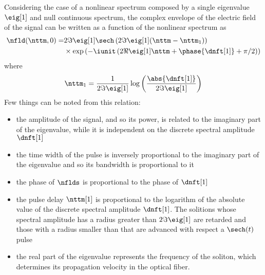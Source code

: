 Considering the case of a nonlinear spectrum composed by a single eigenvalue $\eig[1]$ and
null continuous spectrum, the complex envelope of the electric field of the signal can be written as a function of the nonlinear spectrum as \cite{Ablowitz2004a}
\begin{equation}\label{eq:spectrum_signal_relation}
\begin{split}
    \nfld (\nttm, 0) = &2 \Im{\eig[1]} \sech \left( 2\Im{\eig[1]}
                       (\nttm - \nttm_1) \right)\\
                       &\times \exp \left( -\iunit \left( 2 \Re{\eig[1]} \nttm
                       + \phase{\dnft[1]} + \pi/2 \right) \right)
\end{split}
\end{equation}
where
\begin{equation}\label{eq:relation_delay_discrete_amplitudes}
    \nttm_1 = \dfrac{1}{2 \Im{\eig[1]}}
              \log \left( \dfrac{\abs{\dnft[1]}}{2 \Im{\eig[1]}} \right)
\end{equation}
Few things can be noted from this relation:
\begin{itemize}
 \item the amplitude of the signal, and so its power, is related to the
       imaginary part of the eigenvalue, while it is independent on the discrete
       spectral amplitude $\dnft[1]$
 \item the time width of the pulse is inversely proportional to the imaginary
       part of the eigenvalue and so its bandwidth is proportional to it
 \item the phase of $\nflds$ is proportional to the phase of $\dnft[1]$
 \item the pulse delay $\nttm[1]$ is proportional to the logarithm
       of the absolute value of the discrete spectral amplitude $\dnft[1]$. The
       solitions whose spectral amplitude has a radius greater than $2\Im{\eig[1]}$ are
       retarded and those with a radius smaller than that are advanced with respect
       a $\sech(t)$ pulse
 \item the real part of the eigenvalue represents the frequency of the soliton, which determines its propagation velocity in the optical fiber.
\end{itemize}

